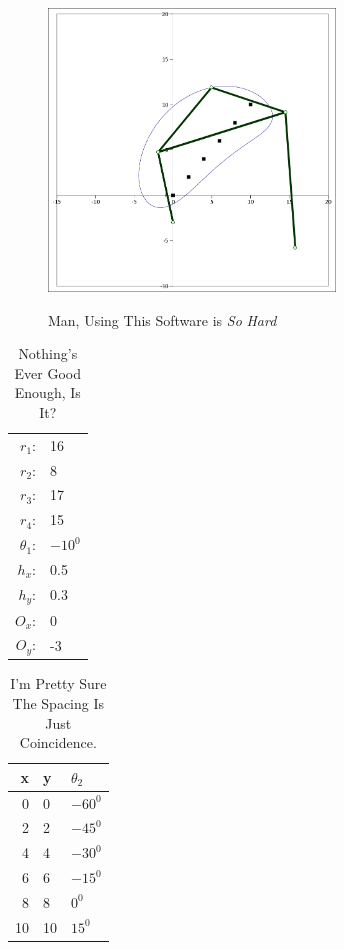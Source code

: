 \documentclass[12pt, letterpaper]{article}
\begin{document}
\begin{figure}[H]
\centering
\caption{Man, Using This Software is \emph{So} \emph{Hard}}
\includegraphics[width=3.0in]{apply_problem}
\label{fig:apply_problem}
\end{figure}

\begin{table}[H]
    \centering
    \caption{Nothing's Ever Good Enough, Is It?}
    \begin{tabular}{r l}
    \(r_1\): & 16\\
    \(r_2\): & 8\\
    \(r_3\): & 17\\
    \(r_4\): & 15\\
    \(\theta_1\): & \(-10^0\)\\
    \(h_x\): & 0.5\\
    \(h_y\): & 0.3\\
    \(O_x\): & 0\\
    \(O_y\): & -3
    \end{tabular}
    \label{tab:startingv}
\end{table}

\begin{table}[H]
    \centering
    \caption{I'm Pretty Sure The Spacing Is Just Coincidence.}
    \begin{tabular}{r l l}
    x & y & \(\theta_2\) \\ \hline
    0 & 0 & \(-60^0\)\\
    2 & 2 & \(-45^0\)\\
    4 & 4 & \(-30^0\)\\
    6 & 6 & \(-15^0\)\\
    8 & 8 & \(0^0\)\\
    10 & 10 & \(15^0\)
    \end{tabular}
    \label{tab:startingthetas}
\end{table}
\end{document}
